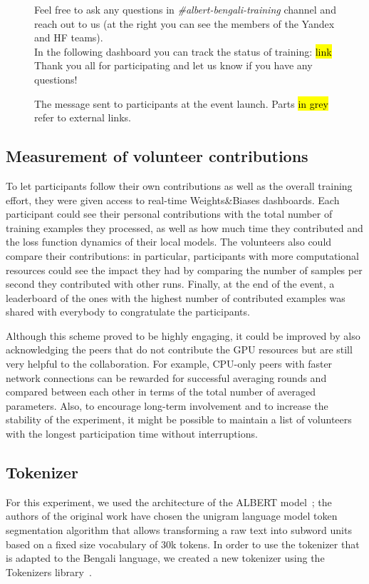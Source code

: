 \begin{figure}[h]
{{Feel free to ask any questions in \textit{\#albert-bengali-training} channel and reach out to us (at the right you can see the members of the Yandex and HF teams).\\
In the following dashboard you can track the status of training: \hl{link}\\

Thank you all for participating and let us know if you have any questions!
}}
  \caption{The message sent to participants at the event launch. Parts \hl{in grey} refer to external links.}
  \label{figure:instruction_message}
  \vspace{-12pt}
\end{figure}

\subsection{Measurement of volunteer contributions}
\label{appendix:contribution_measurement}
To let participants follow their own contributions as well as the overall training effort, they were given access to real-time Weights\&Biases dashboards. Each participant could see their personal contributions with the total number of training examples they processed, as well as how much time they contributed and the loss function dynamics of their local models. The volunteers also could compare their contributions: in particular, participants with more computational resources could see the impact they had by comparing the number of samples per second they contributed with other runs. Finally, at the end of the event, a leaderboard of the ones with the highest number of contributed examples was shared with everybody to congratulate the participants.

Although this scheme proved to be highly engaging, it could be improved by also acknowledging the peers that do not contribute the GPU resources but are still very helpful to the collaboration. For example, CPU-only peers with faster network connections can be rewarded for successful averaging rounds and compared between each other in terms of the total number of averaged parameters. Also, to encourage long-term involvement and to increase the stability of the experiment, it might be possible to maintain a list of volunteers with the longest participation time without interruptions.

\subsection{Tokenizer}
\label{appendix:bn_albert_tokenizer}
For this experiment, we used the architecture of the ALBERT model~\cite{albert}; the authors of the original work have chosen the unigram language model \cite{kudo2018subword} token segmentation algorithm that allows transforming a raw text into subword units based on a fixed size vocabulary of 30k tokens.
In order to use the tokenizer that is adapted to the Bengali language, we created a new tokenizer using the Tokenizers library~\cite{hftokenizers2019}. 

